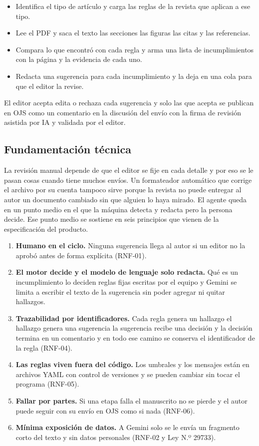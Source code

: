 \begin{itemize}
  \item Identifica el tipo de artículo y carga las reglas de la revista que aplican a ese tipo.
  \item Lee el PDF y saca el texto las secciones las figuras las citas y las referencias.
  \item Compara lo que encontró con cada regla y arma una lista de incumplimientos con la página y la evidencia de cada uno.
  \item Redacta una sugerencia para cada incumplimiento y la deja en una cola para que el editor la revise.
\end{itemize}

El editor acepta edita o rechaza cada sugerencia y solo las que acepta se publican en OJS como un comentario en la discusión del envío con la firma de revisión asistida por IA y validada por el editor.

\subsection{Fundamentación técnica}

La revisión manual depende de que el editor se fije en cada detalle y por eso se le pasan cosas cuando tiene muchos envíos. Un formateador automático que corrige el archivo por su cuenta tampoco sirve porque la revista no puede entregar al autor un documento cambiado sin que alguien lo haya mirado. El agente queda en un punto medio en el que la máquina detecta y redacta pero la persona decide. Ese punto medio se sostiene en seis principios que vienen de la especificación del producto.

\begin{enumerate}
  \item \textbf{Humano en el ciclo.} Ninguna sugerencia llega al autor si un editor no la aprobó antes de forma explícita (RNF-01).
  \item \textbf{El motor decide y el modelo de lenguaje solo redacta.} Qué es un incumplimiento lo deciden reglas fijas escritas por el equipo y Gemini se limita a escribir el texto de la sugerencia sin poder agregar ni quitar hallazgos.
  \item \textbf{Trazabilidad por identificadores.} Cada regla genera un hallazgo el hallazgo genera una sugerencia la sugerencia recibe una decisión y la decisión termina en un comentario y en todo ese camino se conserva el identificador de la regla (RNF-04).
  \item \textbf{Las reglas viven fuera del código.} Los umbrales y los mensajes están en archivos YAML con control de versiones y se pueden cambiar sin tocar el programa (RNF-05).
  \item \textbf{Fallar por partes.} Si una etapa falla el manuscrito no se pierde y el autor puede seguir con su envío en OJS como si nada (RNF-06).
  \item \textbf{Mínima exposición de datos.} A Gemini solo se le envía un fragmento corto del texto y sin datos personales (RNF-02 y Ley N.º 29733).
\end{enumerate}

